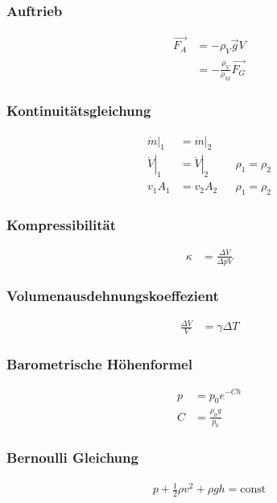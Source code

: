\begin{multicols}{2}{}
\subsubsection{Auftrieb}
\begin{align*}
\vec{F_A}&=-\rho_V \vec{g} V\\
&=-\frac{\rho_V}{\rho_M}\vec{F_G}
\end{align*}

\subsubsection{Kontinuitätsgleichung}
\begin{align*}
\left.\dot{m}\right|_1&=\left.\dot{m}\right|_2\\
\left.\dot{V}\right|_1&=\left.\dot{V}\right|_2&&\rho_1=\rho_2\\
v_1A_1&=v_2A_2&&\rho_1=\rho_2
\end{align*}
\hfill
\end{multicols}

\begin{multicols}{2}{}
\subsubsection{Kompressibilität}
\begin{align*}
\kappa&=\frac{\Delta V}{\Delta p V}
\end{align*}


\subsubsection{Volumenausdehnungskoeffezient}
\begin{align*}
\frac{\Delta V}{V}&= \gamma \Delta T
\end{align*}


\subsubsection{Barometrische Höhenformel}
\begin{align*}
p&=p_0 e^{-Ch}\\
C&=\frac{\rho_0 g}{p_0}
\end{align*}


\subsubsection{Bernoulli Gleichung}
\begin{align*}
p+\frac{1}{2}\rho v^2+ \rho g h= \text{const}
\end{align*}
\end{multicols}


